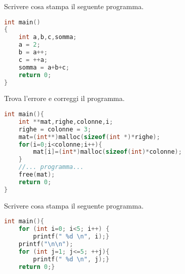 \documentclass[addpoints,11pt]{exam}
\begin{document}
 \boxedpoints
\begin{center}
\end{center}
 
\vspace{5mm}
 
\noindent{}

 

\begin{questions} 

\question[1] Scrivere cosa stampa il seguente programma.

\begin{minipage}[t]{0.4\linewidth}
	\begin{lstlisting}[language=C]
int main()
{
    int a,b,c,somma;
    a = 2;
    b = a++;
    c = ++a;
    somma = a+b+c;
    return 0;
}
\end{lstlisting}
\end{minipage}
\begin{minipage}[t]{0.6\linewidth}
	\makeemptybox{100pt}
\end{minipage}



\question[2]
Trova l'errore e correggi il programma.

\begin{minipage}[t]{0.60\linewidth}
	
		\begin{lstlisting}[language=C]
int main(){
    int **mat,righe,colonne,i;
    righe = colonne = 3;
    mat=(int**)malloc(sizeof(int *)*righe); 
    for(i=0;i<colonne;i++){
        mat[i]=(int*)malloc(sizeof(int)*colonne); 
    }
    //... programma...
    free(mat);  
    return 0;
}
\end{lstlisting}
\end{minipage}
\begin{minipage}[t]{0.4\linewidth}
	\makeemptybox{160pt}
\end{minipage}






\question[2] Scrivere cosa stampa il seguente programma.

\begin{minipage}[t]{0.5\linewidth}
	\begin{lstlisting}[language=C]
int main(){
    for (int i=0; i<5; i++) {
        printf(" %d \n", i);}    
    printf("\n\n");    
    for (int j=1; j<=5; ++j){
        printf(" %d \n", j);}    
    return 0;}
\end{lstlisting}
\end{minipage}
\begin{minipage}[t]{0.5\linewidth}
	\makeemptybox{120pt}
\end{minipage}



\end{questions}
\end{document}
